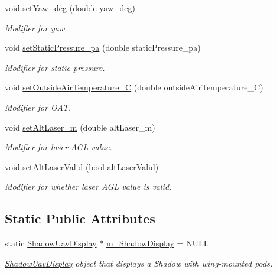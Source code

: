 \begin{DoxyCompactItemize}
void \hyperlink{class_piccolo_telemetry_belief_a6bb59d17dc3365365d091cce2830e417}{setYaw\_\-deg} (double yaw\_\-deg)
\begin{DoxyCompactList}\small\item\em Modifier for yaw. \end{DoxyCompactList}\item 
void \hyperlink{class_piccolo_telemetry_belief_a8c1e9e61cecabd31cc80ea182aa7c79a}{setStaticPressure\_\-pa} (double staticPressure\_\-pa)
\begin{DoxyCompactList}\small\item\em Modifier for static pressure. \end{DoxyCompactList}\item 
void \hyperlink{class_piccolo_telemetry_belief_ac61e0cafff804ef85e90cbc25802f6f6}{setOutsideAirTemperature\_\-C} (double outsideAirTemperature\_\-C)
\begin{DoxyCompactList}\small\item\em Modifier for OAT. \end{DoxyCompactList}\item 
void \hyperlink{class_piccolo_telemetry_belief_a9aeddc8587c1000d207de4decc655aed}{setAltLaser\_\-m} (double altLaser\_\-m)
\begin{DoxyCompactList}\small\item\em Modifier for laser AGL value. \end{DoxyCompactList}\item 
void \hyperlink{class_piccolo_telemetry_belief_a1781ae1125112a8ded32e0e20bace78c}{setAltLaserValid} (bool altLaserValid)
\begin{DoxyCompactList}\small\item\em Modifier for whether laser AGL value is valid. \end{DoxyCompactList}\end{DoxyCompactItemize}
\subsection*{Static Public Attributes}
\begin{DoxyCompactItemize}
\item 
\hypertarget{class_piccolo_telemetry_belief_a8961ef7c02265570e69a702beecb4e99}{
static \hyperlink{class_shadow_uav_display}{ShadowUavDisplay} $\ast$ \hyperlink{class_piccolo_telemetry_belief_a8961ef7c02265570e69a702beecb4e99}{m\_\-ShadowDisplay} = NULL}
\label{class_piccolo_telemetry_belief_a8961ef7c02265570e69a702beecb4e99}

\begin{DoxyCompactList}\small\item\em \hyperlink{class_shadow_uav_display}{ShadowUavDisplay} object that displays a Shadow with wing-\/mounted pods. \end{DoxyCompactList}\end{DoxyCompactItemize}
